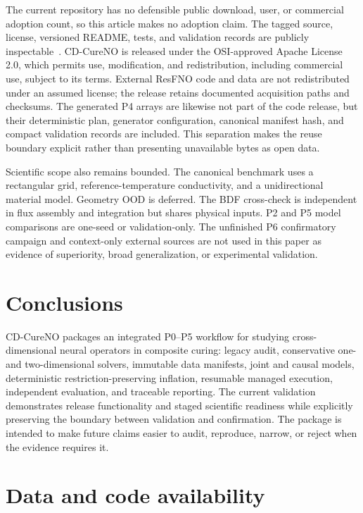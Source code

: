 \documentclass[preprint,12pt]{elsarticle}
\begin{document}
The current repository has no defensible public download, user, or commercial
adoption count, so this article makes no adoption claim. The tagged source,
license, versioned README, tests, and validation records are publicly
inspectable~\cite{cdcureno2026release}. CD-CureNO is released under the
OSI-approved Apache License 2.0, which permits use, modification, and
redistribution, including commercial use, subject to its terms. External
ResFNO code and data are not redistributed under an assumed license; the
release retains documented acquisition paths and checksums. The generated P4
arrays are likewise not part of the code release, but their deterministic plan,
generator configuration, canonical manifest hash, and compact validation
records are included. This separation makes the reuse boundary explicit rather
than presenting unavailable bytes as open data.

Scientific scope also remains bounded. The canonical benchmark uses a
rectangular grid, reference-temperature conductivity, and a unidirectional
material model. Geometry OOD is deferred. The BDF cross-check is independent
in flux assembly and integration but shares physical inputs. P2 and P5 model
comparisons are one-seed or validation-only. The unfinished P6 confirmatory
campaign and context-only external sources are not used in this paper as
evidence of superiority, broad generalization, or experimental validation.

\section{Conclusions}

CD-CureNO packages an integrated P0--P5 workflow for studying
cross-dimensional neural operators in composite curing: legacy audit,
conservative one- and two-dimensional solvers, immutable data manifests,
joint and causal models, deterministic restriction-preserving inflation,
resumable managed execution, independent evaluation, and traceable reporting.
The current validation demonstrates release functionality and staged
scientific readiness while explicitly preserving the boundary between
validation and confirmation. The package is intended to make future claims
easier to audit, reproduce, narrow, or reject when the evidence requires it.

\section*{Data and code availability}
\end{document}
